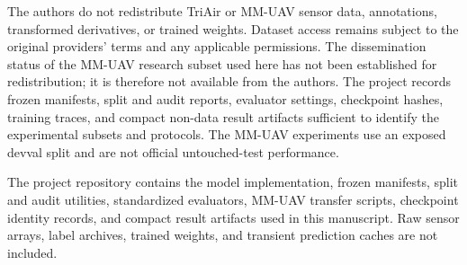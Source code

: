 The authors do not redistribute TriAir or MM-UAV sensor data, annotations, transformed derivatives, or trained weights. Dataset access remains subject to the original providers' terms and any applicable permissions. The dissemination status of the MM-UAV research subset used here has not been established for redistribution; it is therefore not available from the authors. The project records frozen manifests, split and audit reports, evaluator settings, checkpoint hashes, training traces, and compact non-data result artifacts sufficient to identify the experimental subsets and protocols. The MM-UAV experiments use an exposed devval split and are not official untouched-test performance.

The project repository contains the model implementation, frozen manifests, split and audit utilities, standardized evaluators, MM-UAV transfer scripts, checkpoint identity records, and compact result artifacts used in this manuscript. Raw sensor arrays, label archives, trained weights, and transient prediction caches are not included.

